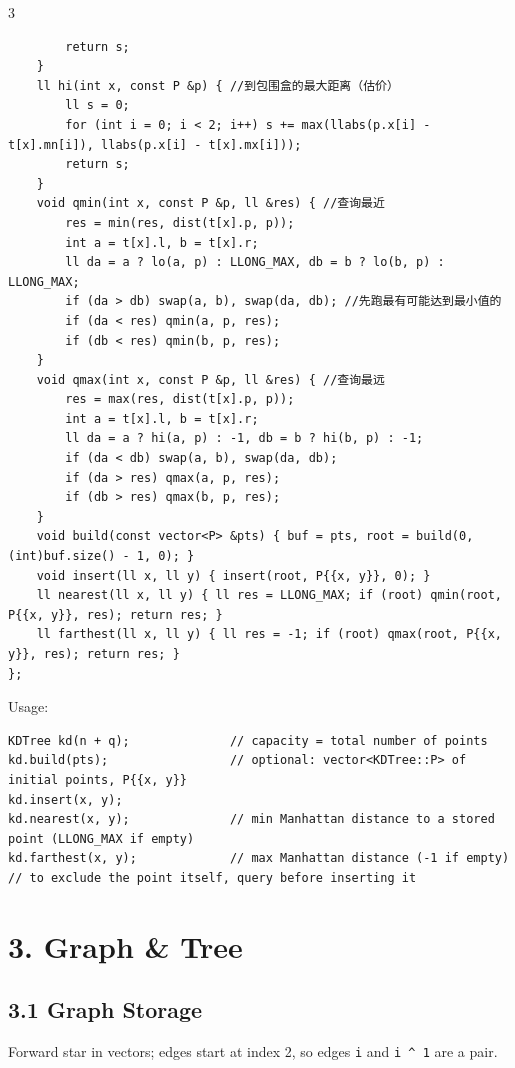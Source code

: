 \documentclass[8pt]{extarticle}
\begin{document}
\begin{multicols*}{3}
\begin{lstlisting}
        return s;
    }
    ll hi(int x, const P &p) { //到包围盒的最大距离（估价）
        ll s = 0;
        for (int i = 0; i < 2; i++) s += max(llabs(p.x[i] - t[x].mn[i]), llabs(p.x[i] - t[x].mx[i]));
        return s;
    }
    void qmin(int x, const P &p, ll &res) { //查询最近
        res = min(res, dist(t[x].p, p));
        int a = t[x].l, b = t[x].r;
        ll da = a ? lo(a, p) : LLONG_MAX, db = b ? lo(b, p) : LLONG_MAX;
        if (da > db) swap(a, b), swap(da, db); //先跑最有可能达到最小值的
        if (da < res) qmin(a, p, res);
        if (db < res) qmin(b, p, res);
    }
    void qmax(int x, const P &p, ll &res) { //查询最远
        res = max(res, dist(t[x].p, p));
        int a = t[x].l, b = t[x].r;
        ll da = a ? hi(a, p) : -1, db = b ? hi(b, p) : -1;
        if (da < db) swap(a, b), swap(da, db);
        if (da > res) qmax(a, p, res);
        if (db > res) qmax(b, p, res);
    }
    void build(const vector<P> &pts) { buf = pts, root = build(0, (int)buf.size() - 1, 0); }
    void insert(ll x, ll y) { insert(root, P{{x, y}}, 0); }
    ll nearest(ll x, ll y) { ll res = LLONG_MAX; if (root) qmin(root, P{{x, y}}, res); return res; }
    ll farthest(ll x, ll y) { ll res = -1; if (root) qmax(root, P{{x, y}}, res); return res; }
};
\end{lstlisting}

Usage:

\begin{lstlisting}
KDTree kd(n + q);              // capacity = total number of points
kd.build(pts);                 // optional: vector<KDTree::P> of initial points, P{{x, y}}
kd.insert(x, y);
kd.nearest(x, y);              // min Manhattan distance to a stored point (LLONG_MAX if empty)
kd.farthest(x, y);             // max Manhattan distance (-1 if empty)
// to exclude the point itself, query before inserting it
\end{lstlisting}

\section*{3. Graph \& Tree}

\subsection*{3.1 Graph Storage}

Forward star in vectors; edges start at index 2, so edges \texttt{i} and \texttt{i \textasciicircum{} 1} are a pair.


\end{multicols*}
\end{document}
